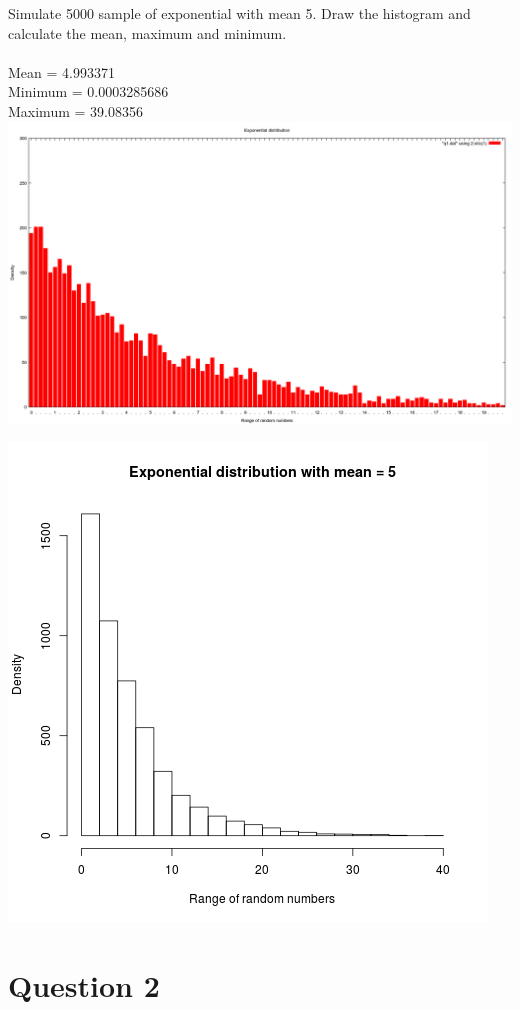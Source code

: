 \documentclass{article}
\begin{document}
Simulate 5000 sample of exponential with mean 5. Draw the histogram and calculate the mean, maximum and minimum.\\\\
Mean =  4.993371 \\
Minimum =  0.0003285686 \\
Maximum =  39.08356 \\
\includegraphics[scale=0.3]{"q1"}

\includegraphics{"plot1"}
\pagebreak

\section{Question 2}
\end{document}
